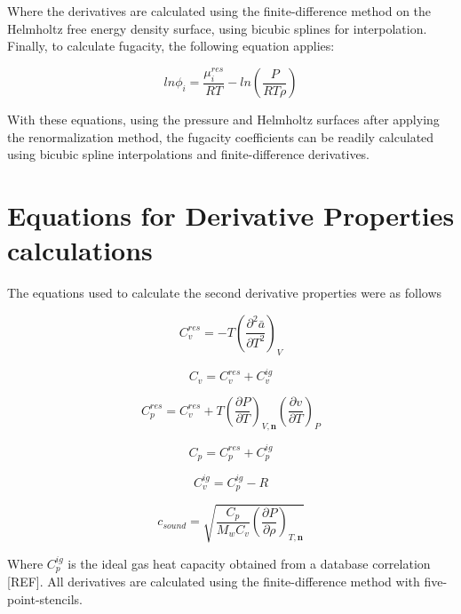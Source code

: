 \documentclass[preprint,12pt,3p]{elsarticle}
\begin{document}
\begin{appendices}
	Where the derivatives are calculated using the finite-difference method on the Helmholtz free energy density surface, using bicubic splines for interpolation. Finally, to calculate fugacity, the following equation applies:

\begin{equation} \label{eq:fugacity}
	ln\phi_{i} = \frac{\mu_{i}^{res}}{RT} - ln\left(\frac{P}{RT\rho}\right)
\end{equation}

	With these equations, using the pressure and Helmholtz surfaces after applying the renormalization method, the fugacity coefficients can be readily calculated using bicubic spline interpolations and finite-difference derivatives.	

\setcounter{equation}{0}
\section{Equations for Derivative Properties calculations}

	The equations used to calculate the second derivative properties were as follows

\begin{equation} \label{eq:Cvres_deriv}
	C_{v}^{res} = -T\left(\frac{\partial^{2}\bar{a}}{\partial T^{2}}\right)_{V}
\end{equation}

\begin{equation} \label{eq:Cv_deriv}
	C_{v} = C_{v}^{res} + C_{v}^{ig}
\end{equation}

\begin{equation} \label{eq:Cpres_deriv}
	C_{p}^{res} = C_{v}^{res} + T \left(\frac{\partial P}{\partial T}\right)_{V,\textbf{n}} \left(\frac{\partial v}{\partial T}\right)_{P}
\end{equation}

\begin{equation} \label{eq:Cp_deriv}
	C_{p} = C_{p}^{res} + C_{p}^{ig}
\end{equation}

\begin{equation} \label{eq:Cvig_deriv}
	C_{v}^{ig} = C_{p}^{ig} - R
\end{equation}

\begin{equation} \label{eq:u_deriv}
	c_{sound} = \sqrt{\frac{C_{p}}{M_{w} C_{v}}\left(\frac{\partial P}{\partial \rho}\right)_{T,\textbf{n}}}
\end{equation}

	Where $C_{p}^{ig}$ is the ideal gas heat capacity obtained from a database correlation [REF]. All derivatives are calculated using the finite-difference method with five-point-stencils.

\end{appendices}

%

\nocite{*}

\section*{\refname}


\end{document}
